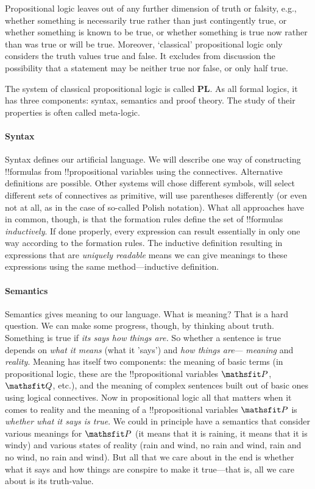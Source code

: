 \documentclass[../../../include/open-logic-section]{subfiles}
\begin{document}
Propositional logic leaves out of any further dimension of truth or falsity, e.g., whether something is necessarily true rather than just contingently true, or whether something is known to be true, or whether something is true now rather than was true or will be true. Moreover, `classical' propositional logic only considers the truth values true and false. It excludes from discussion the possibility that a statement may be neither true nor false, or only half true. 

The system of classical propositional logic is called \textbf{PL}. As all formal logics, it has three components: syntax, semantics and proof theory. The study of their properties is often called meta-logic. 

\paragraph{Syntax}

Syntax defines our artificial language. We will describe one way of constructing !!{formula}s from !!{propositional variable}s using the connectives. Alternative definitions are possible. Other systems will chose different symbols, will select different sets of connectives as primitive, will use parentheses differently (or even not at all, as in the case of so-called Polish notation).  What all approaches have in
common, though, is that the formation rules define the set of !!{formula}s \emph{inductively}. If done properly, every expression can result essentially in only one way according to the formation
rules.  The inductive definition resulting in expressions that are \emph{uniquely readable} means we can give meanings to these expressions using the same method---inductive definition.

\paragraph{Semantics}

Semantics gives meaning to our language. What is meaning? That is a hard question. We can make some progress, though, by thinking about truth. Something is true if \emph{its says how things
are.} So whether a sentence is true depends on \emph{what it means} (what it 'says') and \emph{how things are}--- \emph{meaning} and \emph{reality}. Meaning has itself two components: the meaning of basic terms (in propositional logic, these are the !!{propositional variable}s $\Obj P$, $\Obj Q$, etc.), and the meaning of complex sentences built out of basic ones using logical connectives. Now in propositional logic all that matters when it comes to reality and the meaning of a !!{propositional variable}s $\Obj P$ is \emph{whether what it says is true}. We could in principle have a semantics that consider various meanings for $\Obj P$ (it means that it is raining, it means that it is windy) and various states of reality (rain and wind, no rain and wind, rain and no wind, no rain and wind). But all that we care about in the end is whether what it says and how things are conspire to make it true---that is, all we care about is its truth-value. 
\end{document}
